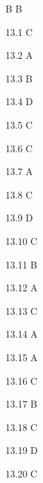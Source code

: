 \begin{Solution}{B}
B
\end{Solution}
\begin{Solution}{13.{1}}
C
\end{Solution}
\begin{Solution}{13.{2}}
A
\end{Solution}
\begin{Solution}{13.{3}}
B
\end{Solution}
\begin{Solution}{13.{4}}
D
\end{Solution}
\begin{Solution}{13.{5}}
C
\end{Solution}
\begin{Solution}{13.{6}}
C
\end{Solution}
\begin{Solution}{13.{7}}
A
\end{Solution}
\begin{Solution}{13.{8}}
C
\end{Solution}
\begin{Solution}{13.{9}}
D
\end{Solution}
\begin{Solution}{13.{10}}
C
\end{Solution}
\begin{Solution}{13.{11}}
B
\end{Solution}
\begin{Solution}{13.{12}}
A
\end{Solution}
\begin{Solution}{13.{13}}
C
\end{Solution}
\begin{Solution}{13.{14}}
A
\end{Solution}
\begin{Solution}{13.{15}}
A
\end{Solution}
\begin{Solution}{13.{16}}
C
\end{Solution}
\begin{Solution}{13.{17}}
B
\end{Solution}
\begin{Solution}{13.{18}}
C
\end{Solution}
\begin{Solution}{13.{19}}
D
\end{Solution}
\begin{Solution}{13.{20}}
C
\end{Solution}
